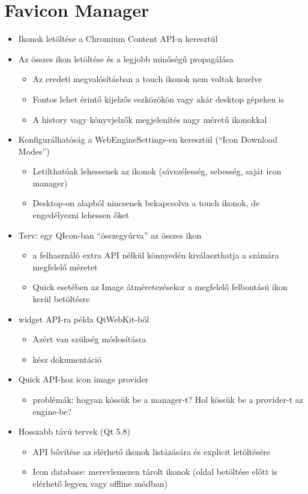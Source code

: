 \documentclass[12pt]{report}
\begin{document}
\section{Favicon Manager}
\begin{itemize}
    \item Ikonok letöltése a Chromium Content API-n keresztül
    \item Az összes ikon letöltése és a legjobb minőségű propagálása
        \begin{itemize}
            \item Az eredeti megvalósításban a touch ikonok nem voltak kezelve
            \item Fontos lehet érintő kijelzős eszközökön vagy akár desktop gépeken is
            \item A history vagy könyvjelzők megjelenítés nagy méretű ikonokkal
        \end{itemize}
    \item Konfigurálhatóság a WebEngineSettings-en keresztül (``Icon Download Modes'')
        \begin{itemize}
            \item Letilthatóak lehessenek az ikonok (sávszélesség, sebesség, saját icon
                manager)
            \item Desktop-on alapból nincsenek bekapcsolva a touch ikonok, de engedélyezni
                lehessen őket
        \end{itemize}
    \item Terv: egy QIcon-ban ``összegyúrva'' az összes ikon
        \begin{itemize}
            \item a felhasználó extra API nélkül könnyedén kiválaszthatja a számára
                megfelelő méretet
            \item Quick esetében az Image átméretezésekor a megfelelő felbontású ikon
                kerül betöltésre
        \end{itemize}
    \item widget API-ra példa QtWebKit-ből
        \begin{itemize}
            \item Azért van szükség módosításra
            \item kész dokumentáció
        \end{itemize}
    \item Quick API-hoz icon image provider
        \begin{itemize}
            \item problémák: hogyan kössük be a manager-t? Hol kössük be a provider-t az
                engine-be?
        \end{itemize}
    \item Hosszabb távú tervek (Qt 5.8)
        \begin{itemize}
            \item API bővítése az elérhető ikonok listázására és explicit letöltésére
            \item Icon database: merevlemezen tárolt ikonok (oldal betöltése előtt is
                elérhető legyen vagy offline módban)
        \end{itemize}
\end{itemize}
\end{document}
